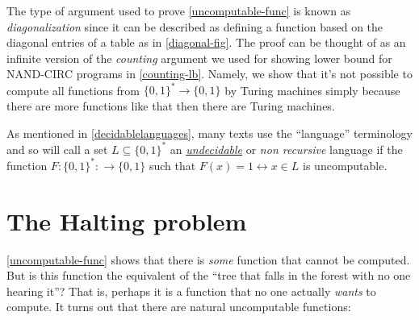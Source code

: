 \hypertarget{uncomputablefunctions}{}


The type of argument used to prove \cref{uncomputable-func} is known as
\emph{diagonalization} since it can be described as defining a function
based on the diagonal entries of a table as in \cref{diagonal-fig}. The
proof can be thought of as an infinite version of the \emph{counting}
argument we used for showing lower bound for NAND-CIRC programs in
\cref{counting-lb}. Namely, we show that it's not possible to compute
all functions from \(\{0,1\}^* \rightarrow \{0,1\}\) by Turing machines
simply because there are more functions like that then there are Turing
machines.

As mentioned in \cref{decidablelanguages}, many texts use the
``language'' terminology and so will call a set
\(L \subseteq \{0,1\}^*\) an
\href{https://goo.gl/3YvQvL}{\emph{undecidable}} or \emph{non recursive}
language if the function \(F:\{0,1\}^* :\rightarrow \{0,1\}\) such that
\(F(x)=1 \leftrightarrow x\in L\) is uncomputable.

\section{The Halting problem}\label{haltingsec}

\cref{uncomputable-func} shows that there is \emph{some} function that
cannot be computed. But is this function the equivalent of the ``tree
that falls in the forest with no one hearing it''? That is, perhaps it
is a function that no one actually \emph{wants} to compute. It turns out
that there are natural uncomputable functions:

